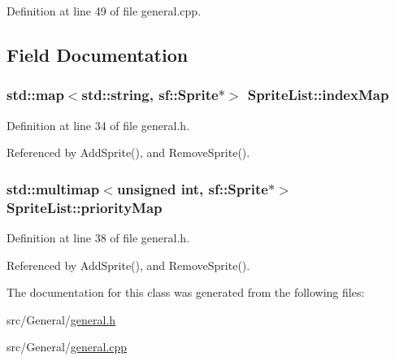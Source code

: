 Definition at line 49 of file general.\-cpp.



\subsection{Field Documentation}
\hypertarget{class_sprite_list_aa0ca6f88f303676cb1592098cf4a38ea}{
\subsubsection[{index\-Map}]{\setlength{\rightskip}{0pt plus 5cm}std\-::map$<$std\-::string, sf\-::\-Sprite$\ast$$>$ Sprite\-List\-::index\-Map\hspace{0.3cm}{\ttfamily [private]}}}\label{class_sprite_list_aa0ca6f88f303676cb1592098cf4a38ea}


Definition at line 34 of file general.\-h.



Referenced by Add\-Sprite(), and Remove\-Sprite().

\hypertarget{class_sprite_list_a79da3c65e989060ad28f5bb2690e757b}{
\subsubsection[{priority\-Map}]{\setlength{\rightskip}{0pt plus 5cm}std\-::multimap$<$unsigned int, sf\-::\-Sprite$\ast$$>$ Sprite\-List\-::priority\-Map\hspace{0.3cm}{\ttfamily [private]}}}\label{class_sprite_list_a79da3c65e989060ad28f5bb2690e757b}


Definition at line 38 of file general.\-h.



Referenced by Add\-Sprite(), and Remove\-Sprite().



The documentation for this class was generated from the following files\-:\begin{DoxyCompactItemize}
\item 
src/\-General/\hyperlink{general_8h}{general.\-h}\item 
src/\-General/\hyperlink{general_8cpp}{general.\-cpp}\end{DoxyCompactItemize}

